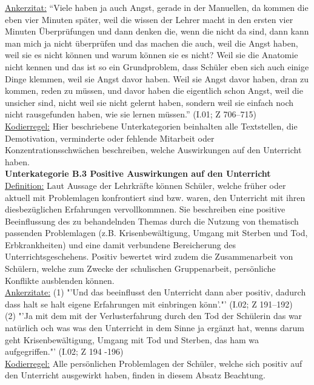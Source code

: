 \underline{Ankerzitat:} "`Viele haben ja auch Angst, gerade in der Manuellen, da kommen die eben vier Minuten später, weil die wissen der Lehrer macht in den ersten vier Minuten Überprüfungen und dann denken die, wenn die nicht da sind, dann kann man mich ja nicht überprüfen und das machen die auch, weil die Angst haben, weil sie es nicht können und warum können sie es nicht? Weil sie die Anatomie nicht kennen und das ist so ein Grundproblem, dass Schüler eben sich auch einige Dinge klemmen, weil sie Angst davor haben. Weil sie Angst davor haben, dran zu kommen, reden zu müssen, und davor haben die eigentlich schon Angst, weil die unsicher sind, nicht weil sie nicht gelernt haben, sondern weil sie einfach noch nicht rausgefunden haben, wie sie lernen müssen."' (I.01; Z 706--715)\\
\underline{Kodierregel:} Hier beschriebene Unterkategorien beinhalten alle Textstellen, die Demotivation, verminderte oder fehlende Mitarbeit oder Konzentrationsschwächen beschreiben, welche Auswirkungen auf den Unterricht haben.\\

\noindent
\textbf{Unterkategorie B.3 Positive Auswirkungen auf den Unterricht}\\
\underline{Definition:} Laut Aussage der Lehrkräfte können Schüler, welche früher oder aktuell mit Problemlagen konfrontiert sind bzw. waren, den Unterricht mit ihren diesbezüglichen Erfahrungen vervollkommnen. Sie beschreiben eine positive Beeinflussung des zu behandelnden Themas durch die Nutzung von thematisch passenden Problemlagen (z.B. Krisenbewältigung, Umgang mit Sterben und Tod, Erbkrankheiten) und eine damit verbundene Bereicherung des Unterrichtsgeschehens. Positiv bewertet wird zudem die Zusammenarbeit von Schülern, welche zum Zwecke der schulischen Gruppenarbeit, persönliche Konflikte ausblenden können.\\
\underline{Ankerzitate:} (1) "'Und das beeinflusst den Unterricht dann aber positiv, dadurch dass halt se halt eigene Erfahrungen mit einbringen könn'."' (I.02; Z 191--192)\\ (2) "'Ja mit dem mit der Verlusterfahrung durch den Tod der Schülerin das war natürlich och was was den Unterricht in dem Sinne ja ergänzt hat, wenns darum geht Krisenbewältigung, Umgang mit Tod und Sterben, das ham wa aufgegriffen."' (I.02; Z 194 -196)\\
\underline{Kodierregel:} Alle persönlichen Problemlagen der Schüler, welche sich positiv auf den Unterricht ausgewirkt haben, finden in diesem Absatz Beachtung.\\

